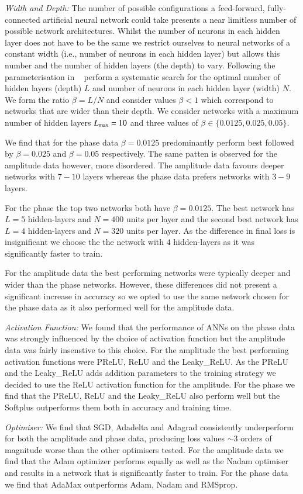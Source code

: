 \documentclass[aps,prd,reprint,superscriptaddress,preprintnumbers,showpacs,nofootinbib]{revtex4-1}
\begin{document}
\emph{Width and Depth:}
The number of possible configurations a feed-forward, fully-connected artificial
neural network could take presents a near limitless number of possible network
architectures. Whilst the number of neurons in each hidden layer does not have
to be the same we restrict ourselves to neural networks of a constant width
(i.e., number of neurons in each hidden layer) but allows this number and the
number of hidden layers (the depth) to vary. Following the parameterisation in
~\cite{2020arXiv200107523A} perform a systematic search for the optimal number
of hidden layers (depth) $L$ and number of neurons in each hidden layer
(width) $N$. We form the ratio $\beta = L/N$ and consider values $\beta < 1$
which correspond to networks that are wider than their depth. We consider
networks with a maximum number of hidden layers $L_{\rm{max}} = 10$ and three
values of $\beta \in \{0.0125, 0.025, 0.05\}$.

We find that for the phase data $\beta = 0.0125$ predominantly perform best
followed by $\beta = 0.025$ and $\beta = 0.05$ respectively. The same patten is
observed for the amplitude data however, more disordered. The
amplitude data favours deeper networks with $7 - 10$ layers whereas the
phase data prefers networks with $3 - 9$ layers.

For the phase the top two networks both have $\beta = 0.0125$. The best network
has $L = 5$ hidden-layers and $N = 400$ units per layer and the second best
network has $L = 4$ hidden-layers and $N = 320$ units per layer. As the
difference in final loss is insignificant we choose the the network with $4$
hidden-layers as it was significantly faster to train.

For the amplitude data the best performing networks were typically deeper
and wider than the phase networks. However, these differences did not present
a significant increase in accuracy so we opted to use the same network
chosen for the phase data as it also performed well for the amplitude data.

\emph{Activation Function:}
We found that the performance of ANNs on the phase data was strongly influenced
by the choice of activation function but the amplitude data was fairly
insenstive to this choice. For the amplitude the best performing activation
functions were PReLU, ReLU and the Leaky\_ReLU. As the PReLU and the Leaky\_ReLU
adds addition parameters to the training strategy we decided to use the ReLU
activation function for the amplitude. For the phase we find that the PReLU,
ReLU and the Leaky\_ReLU also perform well but the Softplus outperforms them
both in accuracy and training time.

\emph{Optimiser:} We find that SGD, Adadelta and Adagrad consistently
underperform for both the amplitude and phase data, producing loss values $\sim
3$ orders of magnitude worse than the other optimisers tested. For the amplitude
data we find that the Adam optimizer performs equally as well as the Nadam
optimiser and results in a network that is significantly faster to train. For
the phase data we find that AdaMax outperforms Adam, Nadam and RMSprop.


\end{document}

